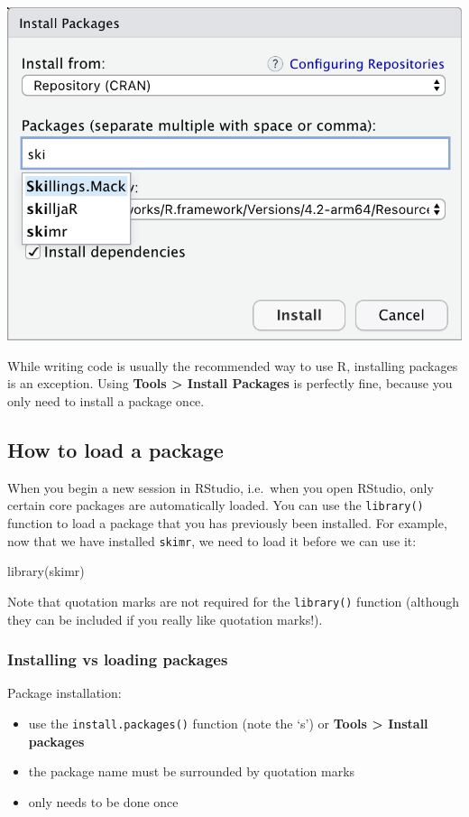 \documentclass[
]{memoir}
\newenvironment{Shaded}{\begin{snugshade}}{\end{snugshade}}
\newcommand{\FunctionTok}[1]{\textcolor[rgb]{0.00,0.00,0.00}{#1}}
\newcommand{\NormalTok}[1]{#1}
\providecommand{\tightlist}{%
  \setlength{\itemsep}{0pt}\setlength{\parskip}{0pt}}
\begin{document}
\includegraphics[width=0.6\linewidth]{img/install-packages}

While writing code is usually the recommended way to use R, installing packages is an exception. Using \textbf{Tools \textgreater{} Install Packages} is perfectly fine, because you only need to install a package once.

\hypertarget{how-to-load-a-package}{%
\subsection{How to load a package}\label{how-to-load-a-package}}

When you begin a new session in RStudio, i.e.~when you open RStudio, only certain core packages are automatically loaded. You can use the \texttt{library()} function to load a package that you has previously been installed. For example, now that we have installed \texttt{skimr}, we need to load it before we can use it:

\begin{Shaded}
\begin{Highlighting}[]
\FunctionTok{library}\NormalTok{(skimr)}
\end{Highlighting}
\end{Shaded}

Note that quotation marks are not required for the \texttt{library()} function (although they can be included if you really like quotation marks!).

\hypertarget{installing-vs-loading-packages}{%
\subsubsection*{Installing vs loading packages}\label{installing-vs-loading-packages}}

Package installation:

\begin{itemize}
\tightlist
\item
  use the \texttt{install.packages()} function (note the `s') or \textbf{Tools \textgreater{} Install packages}
\item
  the package name must be surrounded by quotation marks
\item
  only needs to be done once
\end{itemize}
\end{document}
